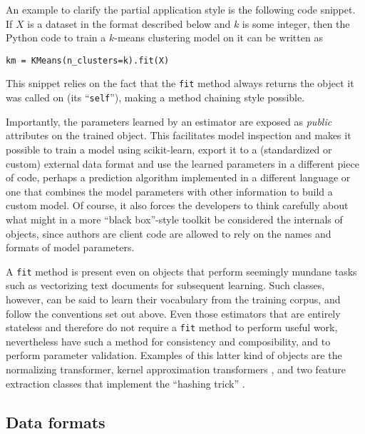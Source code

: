 An example to clarify the partial application style
is the following code snippet.
If $X$ is a dataset in the format described below and $k$ is some integer,
then the Python code to train a $k$-means clustering model on it
can be written as
\begin{verbatim}
km = KMeans(n_clusters=k).fit(X)
\end{verbatim}
This snippet relies on the fact that the \texttt{fit} method
always returns the object it was called on (its ``\texttt{self}''),
making a method chaining style possible.

Importantly, the parameters learned by an estimator
are exposed as \textit{public} attributes on the trained object.
This facilitates model inspection
and makes it possible to train a model using scikit-learn,
export it to a (standardized or custom) external data format
and use the learned parameters in a different piece of code,
perhaps a prediction algorithm implemented in a different language
or one that combines the model parameters with other information
to build a custom model.
Of course, it also forces the developers to think carefully
about what might in a more ``black box''-style toolkit
be considered the internals of objects,
since authors are client code are allowed to rely
on the names and formats of model parameters.

A \texttt{fit} method is present even on objects
that perform seemingly mundane tasks such as vectorizing text documents
for subsequent learning.
Such classes, however, can be said to learn their vocabulary
from the training corpus,
and follow the conventions set out above.
Even those estimators that are entirely stateless and therefore
do not require a \texttt{fit} method to perform useful work,
nevertheless have such a method for consistency and composibility,
and to perform parameter validation.
Examples of this latter kind of objects are the normalizing transformer,
kernel approximation transformers
\citep{rahimi2007random, li2010random, vedaldi2010efficient},
and two feature extraction classes that implement the ``hashing trick''
\citep{weinberger2009}.


\subsection{Data formats}

